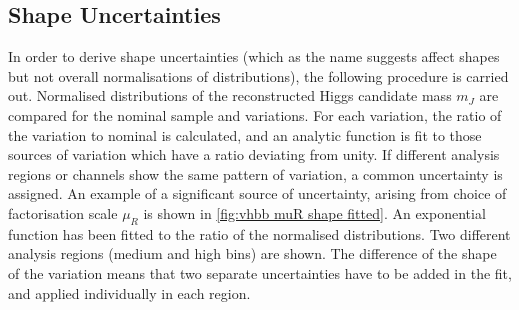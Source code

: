 \subsection{Shape Uncertainties}
In order to derive shape uncertainties (which as the name suggests affect shapes but not overall normalisations of distributions), the following procedure is carried out. Normalised distributions of the reconstructed Higgs candidate mass $m_J$ are compared for the nominal sample and variations. For each variation, the ratio of the variation to nominal is calculated, and an analytic function is fit to those sources of variation which have a ratio deviating from unity. If different analysis regions or channels show the same pattern of variation, a common uncertainty is assigned. An example of a significant source of uncertainty, arising from choice of factorisation scale $\mu_R$ is shown in \cref{fig:vhbb muR shape fitted}. An exponential function has been fitted to the ratio of the normalised distributions. Two different analysis regions (medium and high \pTV bins) are shown. The difference of the shape of the variation means that two separate uncertainties have to be added in the fit, and applied individually in each \pTV region. 
%
